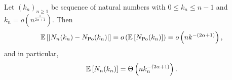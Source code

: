 \begin{lemma}\label{lem:diff_Nk_hyperbolic_binomial_poisson}
Let $(k_n)_{n \ge 1}$ be sequence of natural numbers with $0 \leq k_n \leq n-1$ and $k_n = o(n^{\frac{1}{2\alpha+1}})$. Then
\[
	\mathbb{E}\left[\left|N_{n}(k_n)-N_{{\mathrm{Po}}}(k_n)\right|\right] = o\left(\mathbb{E}\left[N_{{\mathrm{Po}}}(k_n)\right]\right) = o\left(n k^{-(2\alpha+1)}\right),
\]
and in particular,
\[
	\mathbb{E}\left[N_{n}(k_n)\right] = \Theta\left(n k_n^{-(2\alpha + 1)}\right).
\]
\end{lemma}


